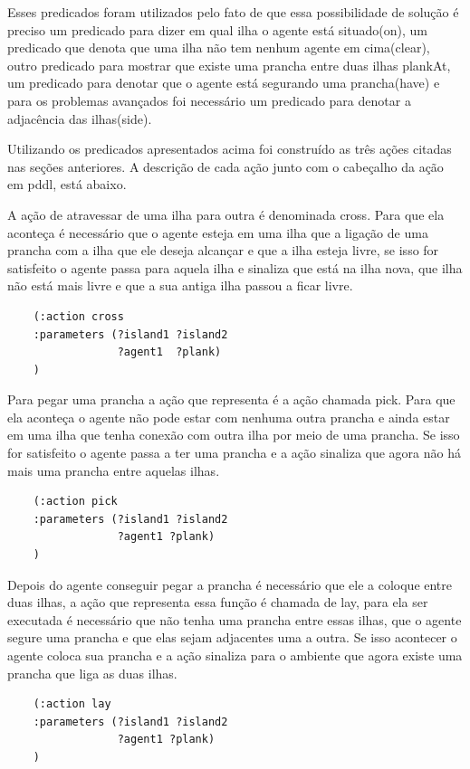 \documentclass[letterpaper]{article}
\begin{document}
Esses predicados foram utilizados pelo fato de que essa possibilidade de solução é preciso um predicado para dizer em qual ilha o agente está situado(on), um predicado que denota que uma ilha não tem nenhum agente em cima(clear), outro predicado para mostrar que existe uma prancha entre duas ilhas plankAt, um predicado para denotar que o agente está segurando uma prancha(have) e para os problemas avançados foi necessário um predicado para denotar a adjacência das ilhas(side).

Utilizando os predicados apresentados acima foi construído as três ações citadas nas seções anteriores. A descrição de cada ação junto com o cabeçalho da ação em pddl, está abaixo.

A ação de atravessar de uma ilha para outra é denominada cross. Para que ela aconteça é necessário que o agente esteja em uma ilha que a ligação de uma prancha com a ilha que ele deseja alcançar e que a ilha esteja livre, se isso for satisfeito o agente passa para aquela ilha e sinaliza que está na ilha nova, que ilha não está mais livre e que a sua antiga ilha passou a ficar livre. 

\begin{verbatim}  
    (:action cross
    :parameters (?island1 ?island2
                 ?agent1  ?plank)
    )
\end{verbatim}

Para pegar uma prancha a ação que representa é a ação chamada pick. Para que ela aconteça o agente não pode estar com nenhuma outra prancha e ainda estar em uma ilha que tenha conexão com outra ilha por meio de uma prancha. Se isso for satisfeito o agente passa a ter uma prancha e a ação sinaliza que agora não há mais uma prancha entre aquelas ilhas. 
\begin{verbatim}  
    (:action pick
    :parameters (?island1 ?island2
                 ?agent1 ?plank)
    )
\end{verbatim}

Depois do agente conseguir pegar a prancha é necessário que ele a coloque entre duas ilhas, a ação que representa essa função é chamada de lay, para ela ser executada é necessário que não tenha uma prancha entre essas ilhas, que o agente segure uma prancha e que elas sejam adjacentes uma a outra. Se isso acontecer o agente coloca sua prancha e a ação sinaliza para o ambiente que agora existe uma prancha que liga as duas ilhas. 
\begin{verbatim}  
    (:action lay
    :parameters (?island1 ?island2
                 ?agent1 ?plank)
    )
\end{verbatim}
\end{document}

